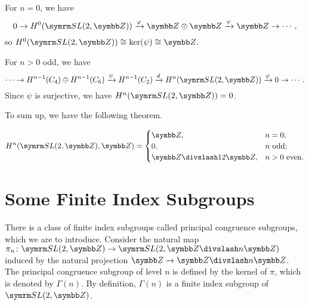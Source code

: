 For $n=0$, we have
\begin{equation*}
  0\to H^0(\SLtZ)\xrightarrow{\varphi} \ZZ\oplus\ZZ\xrightarrow{\psi} \ZZ\to\dotsb,
\end{equation*}
so $H^0(\SLtZ)\cong \KER(\psi)\cong\ZZ$.

For $n>0$ odd, we have
\begin{equation*}
  \dotsb\to H^{n-1}(\CYC4)\oplus H^{n-1}(\CYC6)\xrightarrow{\psi} H^{n-1}(\CYC2)\xrightarrow{d} H^n(\SLtZ)\xrightarrow{\varphi} 0\to\dotsb.
\end{equation*}
Since $\psi$ is surjective, we have $H^n(\SLtZ)=0$.

To sum up, we have the following theorem.

\begin{theorem}
  \begin{equation*}
    H^n(\SLtZ, \ZZ)=
    \begin{cases}
      \ZZ, & n=0;\\
      0, & n\text{ odd};\\
      \ZZ\DIV 12\ZZ, & n>0\text{ even}.
    \end{cases}
  \end{equation*}
\end{theorem}

\section{Some Finite Index Subgroups}

There is a class of finite index subgroups called principal congruence subgroups, which we are to introduce. Consider the natural map $\pi_n\colon\SLtZ\to\SL(2, \ZZ\DIV n\ZZ)$ induced by the natural projection $\ZZ\to \ZZ\DIV n\ZZ$. The principal congruence subgroup of level $n$ is defined by the kernel of $\pi$, which is denoted by $\Gamma(n)$. By definition, $\Gamma(n)$ is a finite index subgroup of $\SLtZ$.

